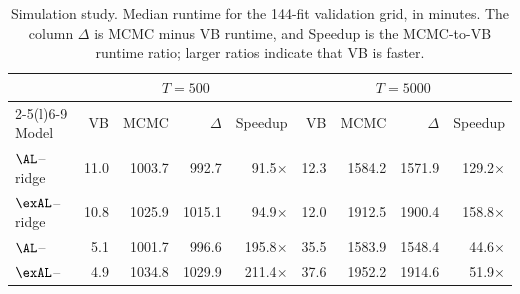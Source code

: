 \begin{table}[t]
\centering
\scriptsize
\setlength{\tabcolsep}{3pt}
\begin{tabular}{@{}lrrrrrrrr@{}}
\toprule
 & \multicolumn{4}{c}{\(T=500\)} & \multicolumn{4}{c}{\(T=5000\)} \\
\cmidrule(lr){2-5}\cmidrule(l){6-9}
Model & VB & MCMC & \(\Delta\) & Speedup & VB & MCMC & \(\Delta\) & Speedup \\
\midrule
\(\AL\)--ridge & 11.0 & 1003.7 & 992.7 & 91.5\(\times\) & 12.3 & 1584.2 & 1571.9 & 129.2\(\times\) \\
\(\exAL\)--ridge & 10.8 & 1025.9 & 1015.1 & 94.9\(\times\) & 12.0 & 1912.5 & 1900.4 & 158.8\(\times\) \\
\(\AL\)--\RHS{} & 5.1 & 1001.7 & 996.6 & 195.8\(\times\) & 35.5 & 1583.9 & 1548.4 & 44.6\(\times\) \\
\(\exAL\)--\RHS{} & 4.9 & 1034.8 & 1029.9 & 211.4\(\times\) & 37.6 & 1952.2 & 1914.6 & 51.9\(\times\) \\
\bottomrule
\end{tabular}
\caption{Simulation study. Median runtime for the 144-fit validation grid, in minutes. The column \(\Delta\) is MCMC minus VB runtime, and Speedup is the MCMC-to-VB runtime ratio; larger ratios indicate that VB is faster.}
\label{tab:simulation-runtime}
\end{table}
